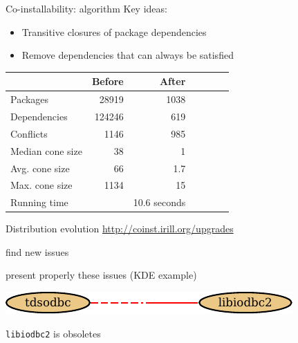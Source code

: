 \documentclass[xcolor={dvipsnames}]{beamer}
\begin{document}
\begin{frame}{Co-installability: algorithm}
Key ideas:
\begin{itemize}
\item Transitive closures of package dependencies
\item Remove dependencies that can always be satisfied
\end{itemize}

\begin{center}
\begin{tabular}{@{}lrrrrrr@{}}
\toprule
& Before & After \\
\midrule
Packages & 28919 & 1038 \\
Dependencies & 124246 & 619 \\
Conflicts & 1146 & 985 \\
Median cone size & 38 & 1 \\
Avg. cone size & 66 & 1.7 \\
Max. cone size & 1134 & 15 \\
\midrule
Running time
& & 10.6 seconds
\\
\bottomrule
\end{tabular}
\end{center}

\end{frame}

\begin{frame}{Distribution evolution}
\url{http://coinst.irill.org/upgrades}

find new issues

present properly these issues (KDE example)

\begin{center}
\includegraphics{figures/libiodbc2}
\end{center}

\texttt{libiodbc2} is obsoletes

\end{frame}
\end{document}

